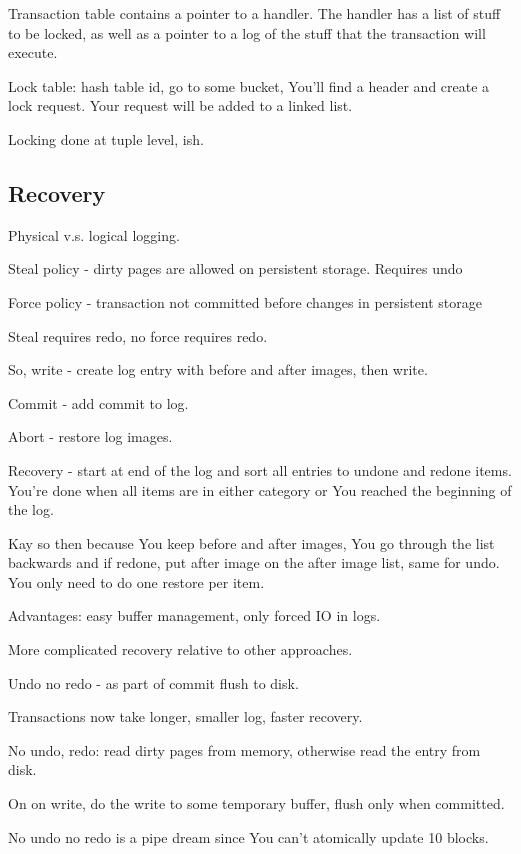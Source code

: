 \documentclass{article}
\begin{document}
		Transaction table contains a pointer to a handler. The handler has a list of stuff to be locked, as well as a pointer to a log of the stuff that the transaction will execute.
		
		Lock table: hash table id, go to some bucket, You'll find a header and create a lock request. Your request will be added to a linked list. 
		
		Locking done at tuple level, ish. 
		
	\subsection{Recovery}
	
		Physical v.s. logical logging.
		
		Steal policy - dirty pages are allowed on persistent storage. Requires undo
		
		Force policy - transaction not committed before changes in persistent storage
		
		Steal requires redo, no force requires redo.
		
		So, write - create log entry with before and after images, then write.
		
		Commit - add commit to log.
		
		Abort - restore log images.
		
		Recovery - start at end of the log and sort all entries to undone and redone items. You're done when all items are in either category or You reached the beginning of the log.
		
		Kay so then because You keep before and after images, You go through the list backwards and if redone, put after image on the after image list, same for undo. You only need to do one restore per item.
		
		Advantages: easy buffer management, only forced IO in logs.
		
		More complicated recovery relative to other approaches.
		
		Undo no redo - as part of commit flush to disk.
		
		Transactions now take longer, smaller log, faster recovery.
		
		No undo, redo: read dirty pages from memory, otherwise read the entry from disk.
		
		On on write, do the write to some temporary buffer, flush only when committed.
		
		No undo no redo is a pipe dream since You can't atomically update 10 blocks.
		
\end{document}
